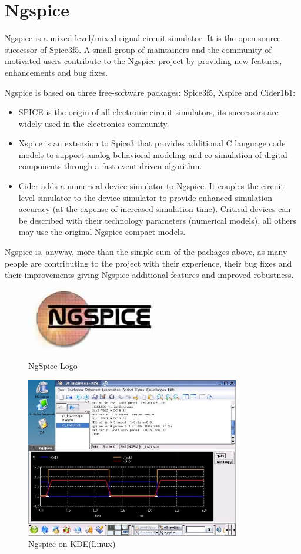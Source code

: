 \documentclass[12pt,a4paper]{report}
\begin{document}
\section{Ngspice}
Ngspice is a mixed-level/mixed-signal circuit simulator. It is the open-source successor of Spice3f5. A small group of maintainers and the community of motivated users contribute to the Ngspice project by providing new features, enhancements and bug fixes.

Ngspice is based on three free-software packages: Spice3f5, Xspice and Cider1b1:
\begin{itemize}
	\itemsep0em
	\item SPICE is the origin of all electronic circuit simulators, its successors are widely used in the electronics community.
	\item Xspice is an extension to Spice3 that provides additional C language code models to support analog behavioral modeling and co-simulation of digital components through a fast event-driven algorithm.
	\item Cider adds a numerical device simulator to Ngspice. It couples the circuit-level simulator to the device simulator to provide enhanced simulation accuracy (at the expense of increased simulation time). Critical devices can be described with their technology parameters (numerical models), all others may use the original Ngspice compact models.
\end{itemize}

Ngspice is, anyway, more than the simple sum of the packages above, as many people are contributing to the project with their experience, their bug fixes and their improvements giving Ngspice additional features and improved robustness.

\begin{figure}[h]
	\centering
	\includegraphics[scale=0.5]{ngspice-logo}
	\caption{NgSpice Logo}
	\vspace{5mm}
	\includegraphics[height=7cm]{ngspice}
	\caption{Ngspice on KDE(Linux)}
\end{figure}
\end{document}
